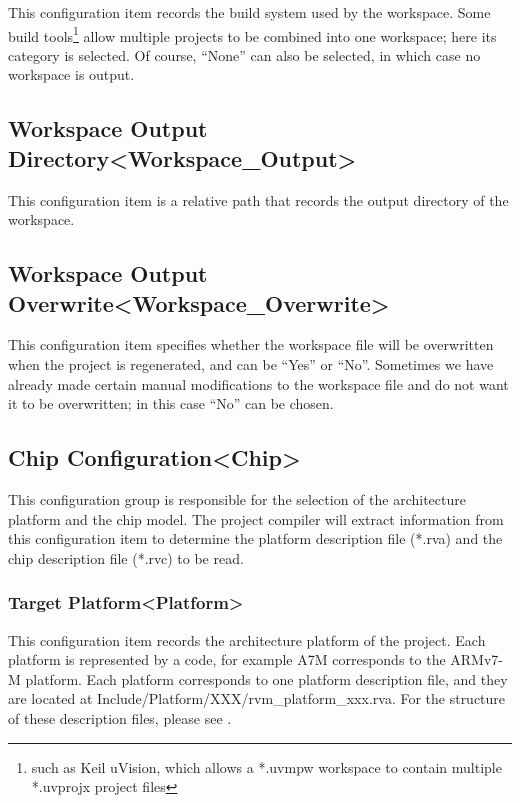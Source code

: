 This configuration item records the build system used by the workspace. Some build tools\footnote{such as Keil uVision, which allows a *.uvmpw workspace to contain multiple *.uvprojx project files} allow multiple projects to be combined into one workspace; here its category is selected. Of course, ``None'' can also be selected, in which case no workspace is output.

\subsection{Workspace Output Directory<Workspace\_Output>{}}\label{subsec:5-3-7}

This configuration item is a relative path that records the output directory of the workspace.

\subsection{Workspace Output Overwrite<Workspace\_Overwrite>{}}\label{subsec:5-3-8}

This configuration item specifies whether the workspace file will be overwritten when the project is regenerated, and can be ``Yes'' or ``No''. Sometimes we have already made certain manual modifications to the workspace file and do not want it to be overwritten; in this case ``No'' can be chosen.

\subsection{Chip Configuration<Chip>{}}\label{subsec:5-3-9}

This configuration group is responsible for the selection of the architecture platform and the chip model. The project compiler will extract information from this configuration item to determine the platform description file (*.rva) and the chip description file (*.rvc) to be read.

\subsubsection{Target Platform<Platform>{}}\label{subsubsec:5-3-9-1}

This configuration item records the architecture platform of the project. Each platform is represented by a code, for example A7M corresponds to the ARMv7-M platform. Each platform corresponds to one platform description file, and they are located at Include/Platform/XXX/rvm\_platform\_xxx.rva. For the structure of these description files, please see .

